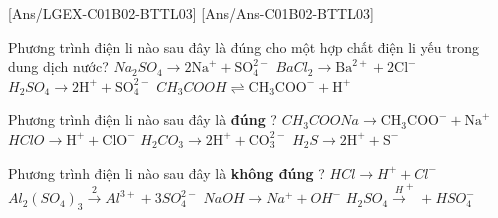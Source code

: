 [Ans/LGEX-C01B02-BTTL03]
[Ans/Ans-C01B02-BTTL03]
\begin{ex}
	Phương trình điện li nào sau đây là đúng cho một hợp chất điện li yếu trong dung dịch nước?
	\choice
	{$Na_2SO_4 \rightarrow 2\text{Na}^+ + \text{SO}_4^{2-}$}
	{$BaCl_2 \rightarrow \text{Ba}^{2+} + 2\text{Cl}^-$}
	{$H_2SO_4 \rightarrow 2\text{H}^+ + \text{SO}_4^{2-}$}
	{\True $CH_3COOH \rightleftharpoons \text{CH}_3\text{COO}^- + \text{H}^+$}
\end{ex}
\begin{ex}
	Phương trình điện li nào sau đây là \textbf{đúng} ?
	\choice
	{\True $CH_3COONa \rightarrow \text{CH}_3\text{COO}^- + \text{Na}^+$}
	{$HClO \rightarrow \text{H}^+ + \text{ClO}^-$}
	{$H_2CO_3 \rightarrow 2\text{H}^+ + \text{CO}_3^{2-}$}
	{$H_2S \rightarrow 2\text{H}^+ + \text{S}^-$}
\end{ex}
\begin{ex}
	Phương trình điện li nào sau đây là \textbf{không đúng} ?
	\choice
	{$HCl \xrightarrow{}  H^+ + Cl^{-}$}
	{$Al_2{(SO_4)}_3 \xrightarrow  2Al^{3+} + 3SO_4^{2-}$}
	{$NaOH \xrightarrow{}  Na^+ + OH^{-}$}
	{\True $H_2SO_4 \xrightarrow  H^+ + HSO_4^{-}$}
\end{ex}

